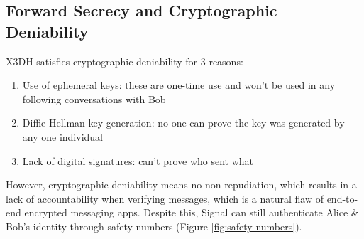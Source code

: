 \documentclass[11pt]{article}
\begin{document}
\subsection{Forward Secrecy and Cryptographic Deniability}
X3DH satisfies cryptographic deniability for 3 reasons:
\begin{enumerate}
    \item Use of ephemeral keys: these are one-time use and won't be used in any following conversations with Bob
    \item Diffie-Hellman key generation: no one can prove the key was generated by any one individual
    \item Lack of digital signatures: can't prove who sent what
\end{enumerate}
However, cryptographic deniability means no non-repudiation, which results in a lack of accountability when verifying messages, which is a natural flaw of end-to-end encrypted messaging apps. Despite this, Signal can still authenticate Alice \& Bob's identity through safety numbers (Figure \ref{fig:safety-numbers}).
\end{document}
